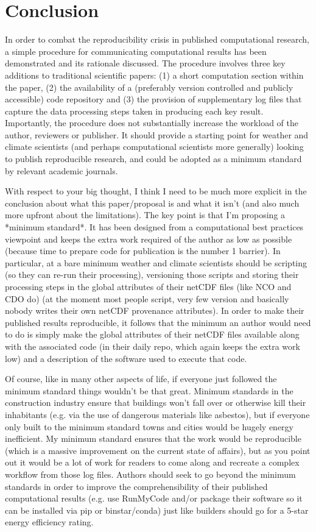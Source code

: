 \section{Conclusion}

In order to combat the reproducibility crisis in published computational research, a simple procedure for communicating computational results has been demonstrated \citep{Irving2015} and its rationale discussed. The procedure involves three key additions to traditional scientific papers: (1) a short computation section within the paper, (2) the availability of a (preferably version controlled and publicly accessible) code repository and (3) the provision of supplementary log files that capture the data processing steps taken in producing each key result. Importantly, the procedure does not substantially increase the workload of the author, reviewers or publisher. It should provide a starting point for weather and climate scientists (and perhaps computational scientists more generally) looking to publish reproducible research, and could be adopted as a minimum standard by relevant academic journals.

With respect to your big thought, I think I need to be much more explicit in the conclusion about what this paper/proposal is and what it isn't (and also much more upfront about the limitations). The key point is that I'm proposing a *minimum standard*. It has been designed from a computational best practices viewpoint and keeps the extra work required of the author as low as possible (because time to prepare code for publication is the number 1 barrier). In particular, at a bare minimum weather and climate scientists should be scripting (so they can re-run their processing), versioning those scripts and storing their processing steps in the global attributes of their netCDF files (like NCO and CDO do) (at the moment most people script, very few version and basically nobody writes their own netCDF provenance attributes). In order to make their published results reproducible, it follows that the minimum an author would need to do is simply make the global attributes of their netCDF files available along with the associated code (in their daily repo, which again keeps the extra work low) and a description of the software used to execute that code.

Of course, like in many other aspects of life, if everyone just followed the minimum standard things wouldn't be that great. Minimum standards in the construction industry ensure that buildings won't fall over or otherwise kill their inhabitants (e.g. via the use of dangerous materials like asbestos), but if everyone only built to the minimum standard towns and cities would be hugely energy inefficient. My minimum standard ensures that the work would be reproducible (which is a massive improvement on the current state of affairs), but as you point out it would be a lot of work for readers to come along and recreate a complex workflow from those log files. Authors should seek to go beyond the minimum standards in order to improve the comprehensibility of their published computational results (e.g. use RunMyCode and/or package their software so it can be installed via pip or binstar/conda) just like builders should go for a 5-star energy efficiency rating.
